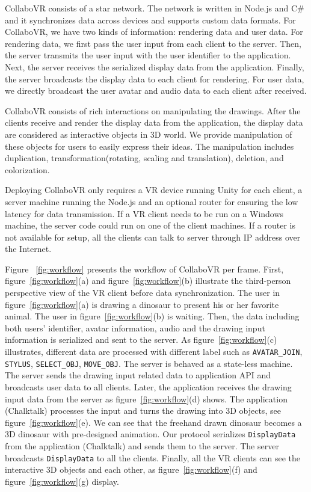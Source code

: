 \documentclass{sigchi}
\begin{document}
CollaboVR consists of a star network. The network is written in Node.js and C\# and it synchronizes data across devices and supports custom data formats. For CollaboVR, we have two kinds of information: rendering data and user data. For rendering data, we first pass the user input from each client to the server. Then, the server transmits the user input with the user identifier to the application. Next, the server receives the serialized display data from the application. Finally, the server broadcasts the display data to each client for rendering. For user data, we directly broadcast the user avatar and audio data to each client after received.

CollaboVR consists of rich interactions on manipulating the drawings. After the clients receive and render the display data from the application, the display data are considered as interactive objects in 3D world. We provide manipulation of these objects for users to easily express their ideas. The manipulation includes duplication, transformation(rotating, scaling and translation), deletion, and colorization.

Deploying CollaboVR only requires a VR device running Unity for each client, a server machine running the Node.js and an optional router for ensuring the low latency for data transmission. If a VR client needs to be run on a Windows machine, the server code could run on one of the client machines. If a router is not available for setup, all the clients can talk to server through IP address over the Internet. 


Figure ~\ref{fig:workflow} presents the workflow of CollaboVR per frame. First, figure~\ref{fig:workflow}(a) and figure~\ref{fig:workflow}(b) illustrate the third-person perspective view of the VR client before data synchronization. The user in figure~\ref{fig:workflow}(a) is drawing a dinosaur to present his or her favorite animal. The user in figure~\ref{fig:workflow}(b) is waiting. Then, the data including both users' identifier, avatar information, audio and the drawing input information is serialized and sent to the server. As figure~\ref{fig:workflow}(c) illustrates, different data are processed with different label such as \verb|AVATAR_JOIN|, \verb|STYLUS|, \verb|SELECT_OBJ|, \verb|MOVE_OBJ|. The server is behaved as a state-less machine. The server sends the drawing input related data to application API and broadcasts user data to all clients. Later, the application receives the drawing input data from the server as figure~\ref{fig:workflow}(d) shows. The application (Chalktalk) processes the input and turns the drawing into 3D objects, see figure~\ref{fig:workflow}(e). We can see that the freehand drawn dinosaur becomes a 3D dinosaur with pre-designed animation. Our protocol serializes \verb|DisplayData| from the application (Chalktalk) and sends them to the server. The server broadcasts \verb|DisplayData| to all the clients. Finally, all the VR clients can see the interactive 3D objects and each other, as figure~\ref{fig:workflow}(f) and figure~\ref{fig:workflow}(g) display.
\end{document}
